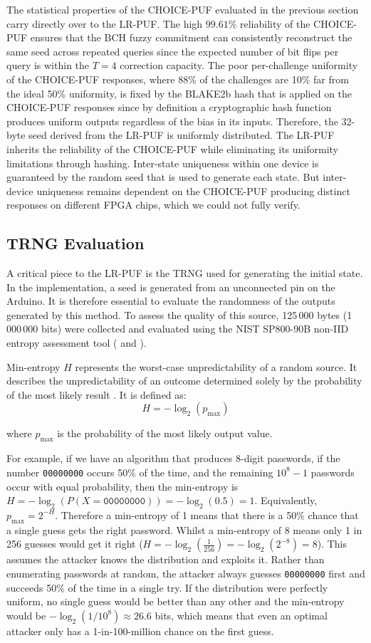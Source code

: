 The statistical properties of the CHOICE-PUF evaluated in the previous section carry directly over to the LR-PUF. The high $99.61\%$ reliability of the CHOICE-PUF ensures that the BCH fuzzy commitment can consistently reconstruct the same seed across repeated queries since the expected number of bit flips per query is within the $T=4$ correction capacity. The poor per-challenge uniformity of the CHOICE-PUF responses, where 88\% of the challenges are 10\% far from the ideal 50\% uniformity, is fixed by the BLAKE2b hash that is applied on the CHOICE-PUF responses since by definition a cryptographic hash function produces uniform outputs regardless of the bias in its inputs. Therefore, the 32-byte seed derived from the LR-PUF is uniformly distributed. The LR-PUF inherits the reliability of the CHOICE-PUF while eliminating its uniformity limitations through hashing. Inter-state uniqueness within one device is guaranteed by the random seed that is used to generate each state. But inter-device uniqueness remains dependent on the CHOICE-PUF producing distinct responses on different FPGA chips, which we could not fully verify.

\subsection{TRNG Evaluation}
A critical piece to the LR-PUF is the TRNG used for generating the initial state. In the implementation, a seed is generated from an unconnected pin on the Arduino. It is therefore essential to evaluate the randomness of the outputs generated by this method. To assess the quality of this source, 125\,000 bytes (1\,000\,000 bits) were collected and evaluated using the NIST SP800-90B non-IID entropy assessment tool (\cite{nist_sp800_90b} and \cite{sp800_90b_entropy_assessment}).

Min-entropy $H$ represents the worst-case unpredictability of a random source. It describes the unpredictability of an outcome determined solely by the probability of the most likely result \cite{crypto_se_63797}. It is defined as:
$$
H = -\log_2(p_{\max})
$$

where $p_{\max}$ is the probability of the most likely output value.

For example, if we have an algorithm that produces 8-digit passwords, if the number \verb|00000000| occurs 50\% of the time, and the remaining $10^8-1$ passwords occur with equal probability, then the min-entropy is $H=-\log_2(P(X=\texttt{00000000}))=-\log_2(0.5)=1$.
Equivalently, $p_{\max} = 2^{-H}$. Therefore a min-entropy of 1 means that there is a 50\% chance that a single guess gets the right password. Whilst a min-entropy of 8 means only 1 in 256 guesses would get it right ($H = -\log_2\left(\tfrac{1}{256}\right) = -\log_2(2^{-8}) = 8$). This assumes the attacker knows the distribution and exploits it. Rather than enumerating passwords at random, the attacker always guesses \texttt{00000000} first and succeeds 50\% of the time in a single try. If the distribution were perfectly uniform, no single guess would be better than any other and the min-entropy would be $-\log_2(1/10^8) \approx 26.6$ bits, which means that even an optimal attacker only has a 1-in-100-million chance on the first guess.

